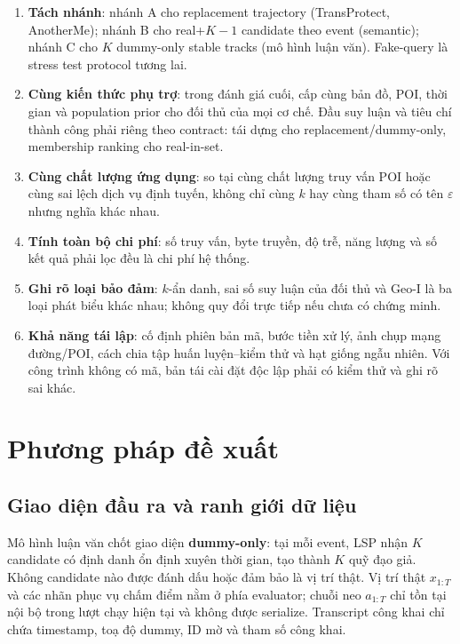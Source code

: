 \documentclass[12pt,a4paper,oneside]{report}
\begin{document}
\begin{enumerate}
  \item \textbf{Tách nhánh}: nhánh A cho replacement trajectory (TransProtect, AnotherMe); nhánh B cho real+$K-1$ candidate theo event (semantic); nhánh C cho $K$ dummy-only stable tracks (mô hình luận văn). Fake-query là stress test protocol tương lai.
  \item \textbf{Cùng kiến thức phụ trợ}: trong đánh giá cuối, cấp cùng bản đồ, POI, thời gian và population prior cho đối thủ của mọi cơ chế. Đầu suy luận và tiêu chí thành công phải riêng theo contract: tái dựng cho replacement/dummy-only, membership ranking cho real-in-set.
  \item \textbf{Cùng chất lượng ứng dụng}: so tại cùng chất lượng truy vấn POI hoặc cùng sai lệch dịch vụ định tuyến, không chỉ cùng $k$ hay cùng tham số có tên $\varepsilon$ nhưng nghĩa khác nhau.
  \item \textbf{Tính toàn bộ chi phí}: số truy vấn, byte truyền, độ trễ, năng lượng và số kết quả phải lọc đều là chi phí hệ thống.
  \item \textbf{Ghi rõ loại bảo đảm}: $k$-ẩn danh, sai số suy luận của đối thủ và Geo-I là ba loại phát biểu khác nhau; không quy đổi trực tiếp nếu chưa có chứng minh.
  \item \textbf{Khả năng tái lập}: cố định phiên bản mã, bước tiền xử lý, ảnh chụp mạng đường/POI, cách chia tập huấn luyện--kiểm thử và hạt giống ngẫu nhiên. Với công trình không có mã, bản tái cài đặt độc lập phải có kiểm thử và ghi rõ sai khác.
\end{enumerate}

\chapter{Phương pháp đề xuất}
\label{ch:method}

\section{Giao diện đầu ra và ranh giới dữ liệu}

Mô hình luận văn chốt giao diện \textbf{dummy-only}: tại mỗi event, LSP nhận $K$ candidate có định danh ổn định xuyên thời gian, tạo thành $K$ quỹ đạo giả. Không candidate nào được đánh dấu hoặc đảm bảo là vị trí thật. Vị trí thật $x_{1:T}$ và các nhãn phục vụ chấm điểm nằm ở phía evaluator; chuỗi neo $a_{1:T}$ chỉ tồn tại nội bộ trong lượt chạy hiện tại và không được serialize. Transcript công khai chỉ chứa timestamp, toạ độ dummy, ID mờ và tham số công khai.
\end{document}
